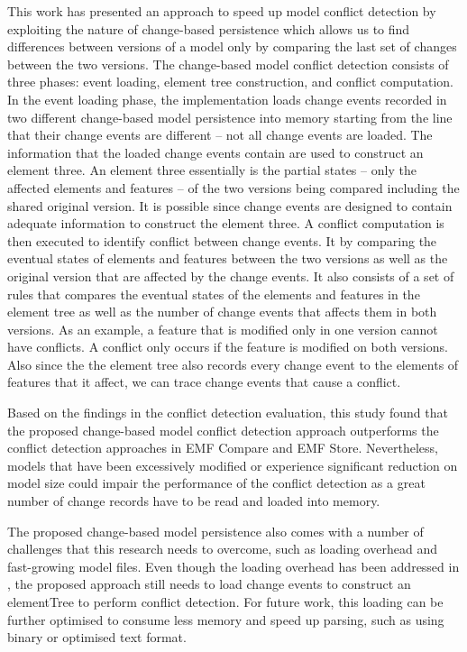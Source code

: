 This work has presented an approach to speed up model conflict detection by exploiting the nature of change-based persistence which allows us to find differences between versions of a model only by comparing the last set of changes between the two versions. The change-based model conflict detection consists of three phases: event loading, element tree construction, and conflict computation. In the event loading phase, the implementation loads change events recorded in two different change-based model persistence into memory starting from the line that their change events are different -- not all change events are loaded. The information that the loaded change events contain are used to construct an element three. An element three essentially is the partial states -- only the affected elements and features -- of the two versions being compared including the shared original version. It is possible since change events are designed to contain adequate information to construct the element three. A conflict computation is then executed to identify conflict between change events. It by comparing the eventual states of elements and features between the two versions as well as the original version that are affected by the change events. It also consists of a set of rules that compares the eventual states of the elements and features in the element tree as well as the number of change events that affects them in both versions. As an example, a feature that is modified only in one version cannot have conflicts. A conflict only occurs if the feature is modified on both versions. Also since the the element tree also records every change event to the elements of features that it affect, we can trace change events that cause a conflict.

Based on the findings in the conflict detection evaluation, this study found that the proposed change-based model conflict detection approach outperforms the conflict detection approaches in EMF Compare and EMF Store. Nevertheless, models that have been excessively modified or experience significant reduction on model size could impair the performance of the conflict detection as a great number of change records have to be read and loaded into memory. 

The proposed change-based model persistence also comes with a number of challenges that this research needs to overcome, such as loading overhead and fast-growing model files. Even though the loading overhead has been addressed in \cite{DBLP:conf/models/YohannisRPK18}, the proposed approach still needs to load change events to construct an \textsf{elementTree} to perform conflict detection. For future work, this loading can be further optimised to consume less memory and speed up parsing, such as using binary or optimised text format.

